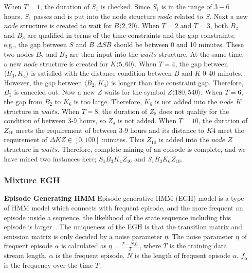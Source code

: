When $T=1$, the duration of $S_1$ is checked. 
Since $S_1$ is in the range of $3-6$ hours, 
$S_1$ passes and is put into the node structure $node$ related to $S$. 
Next a new $node$ structure is created to wait for $B\langle 2, 20 \rangle $. 
When $T=2$ and $T=3$, both $B_2$ and $B_3$ 
are qualified in terms of the time constraints and 
the gap constraints; 
e.g., the gap between $S$ and $B$ $\Delta SB$ should 
be between 0 and 10 minutes. 
These two nodes $B_2$ and $B_3$ are then input into the 
$waits$ structure. 
At the same time, 
a new $node$ structure is created for $K\langle 5, 60 \rangle $. 
When $T=4$, the gap between $\langle B_3, K_4 \rangle$ 
is satisfied with the distance condition between 
$B$ and $K$ 0-40 minutes. 
However, the gap between $\langle B_2, K_4 \rangle$ 
is longer than the constraint gap. 
Therefore, $B_2$ is canceled out. 
Now a new $Z$ waits for the symbol $Z\langle 180, 540 \rangle$. 
When $T=6$, the gap from $B_2$ to $K_6$ is 
too large. Therefore, $K_6$ is not added into the $node$ $K$ structure in $waits$.
When $T=8$, the duration of $Z_8$ does not qualify for the condition of between 3-9 hours,  
so $Z_8$ is not added. 
When $T=10$, the duration of $Z_{10}$ meets the requirement of between 3-9 hours 
and its distance to $K4$ meet the requirement 
of $\Delta KZ \in [0,100]$ minutes. 
Thus $Z_{10}$ is added into the $node$ $Z$ structure in $waits$.
Therefore, complete mining of an episode is complete, and 
we have mined two instances here; $S_1B_3K_4Z_{10}$ and $S_1B_3K_6Z_{10}$. 


\subsubsection{Mixture EGH}
\textbf{Episode Generating HMM}
Episode generative HMM (EGH) model is a 
type of HMM model which connects with frequent episode, 
and the more frequent an episode inside a sequence, 
the likelihood of the state sequence including this episode is larger~\cite{laxman2008stream}.  
The uniqueness of the EGH is that 
the transition matrix and 
emission matrix is only decided by a noise parameter $\eta$. 
The noise parameter $\eta$ of frequent episode $\alpha$ 
is calculated as $\eta=\frac{T-Nf_{\alpha}}{T}$,  
where $T$ is the training data stream length, 
$\alpha$ is the frequent episode, 
$N$ is the length of frequent episode $\alpha$, 
$f_{\alpha}$ is the frequency over the time $T$.

